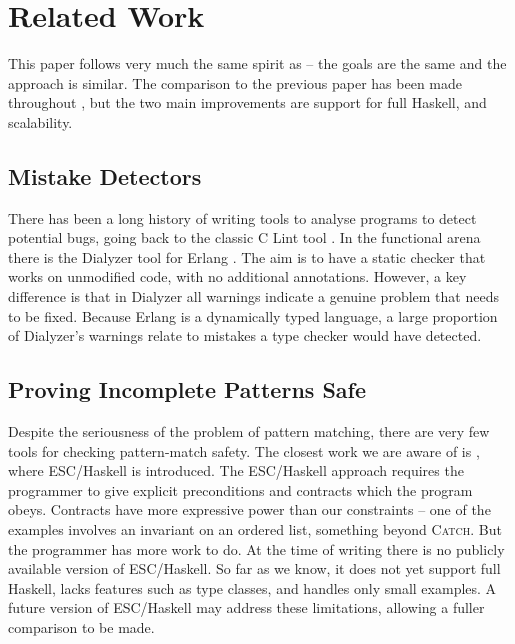 \documentclass[preprint]{sigplanconf}
\let\cite=\citep
\newcommand{\catch}{\textsc{Catch}}
\newenvironment{discuss}
    {\noindent\hspace{-1.5mm}\vline\hspace{1mm}\vline\hspace{1mm}\begin{minipage}[h]{\linewidth}}
    {\end{minipage}}
\begin{document}
\section{Related Work}
\label{sec:related}

\begin{discuss}
This paper follows very much the same spirit as \cite{me:catch_tfp} -- the goals are the same and the approach is similar. The comparison to the previous paper has been made throughout , but the two main improvements are support for full Haskell, and scalability.
\end{discuss}

\subsection{Mistake Detectors}

There has been a long history of writing tools to analyse programs to detect potential bugs, going back to the classic C Lint tool \citep{lint}. In the functional arena there is the Dialyzer tool \citep{dialyzer} for Erlang \citep{erlang}. The aim is to have a static checker that works on unmodified code, with no additional annotations. However, a key difference is that in Dialyzer all warnings indicate a genuine problem that needs to be fixed. Because Erlang is a dynamically typed language, a large proportion of Dialyzer's warnings relate to mistakes a type checker would have detected.

\subsection{Proving Incomplete Patterns Safe}

Despite the seriousness of the problem of pattern matching, there are very few tools for checking pattern-match safety. The closest work we are aware of is \citep{esc_haskell}, where ESC/Haskell is introduced. The ESC/Haskell approach requires the programmer to give explicit preconditions and contracts which the program obeys. Contracts have more expressive power than our constraints -- one of the examples involves an invariant on an ordered list, something beyond \catch{}. But the programmer has more work to do. At the time of writing there is no publicly available version of ESC/Haskell. So far as we know, it does not yet support full Haskell, lacks features such as type classes, and handles only small examples. A future version of ESC/Haskell may address these limitations, allowing a fuller comparison to be made.
\end{document}
